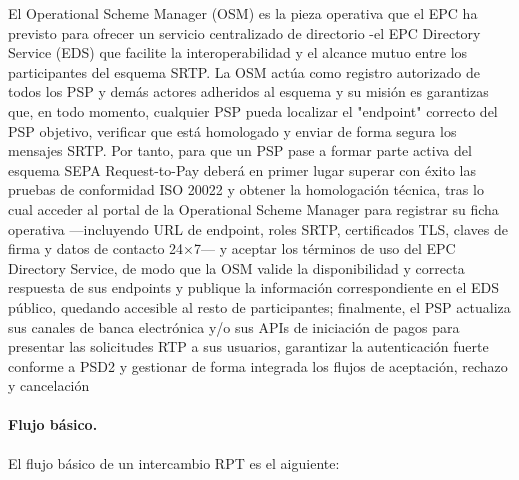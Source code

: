 El Operational Scheme Manager (OSM) es la pieza operativa que el EPC ha previsto para ofrecer un servicio centralizado de directorio -el EPC Directory Service (EDS) que facilite la interoperabilidad y el alcance mutuo entre los participantes del esquema SRTP.
La OSM actúa como registro autorizado de todos los PSP y demás actores adheridos al esquema y su misión es garantizas que, en todo momento, cualquier PSP pueda localizar el "endpoint" correcto del PSP objetivo, verificar que está homologado y enviar de forma segura los mensajes SRTP.
Por tanto, para que un PSP pase a formar parte activa del esquema SEPA Request-to-Pay deberá en primer lugar superar con éxito las pruebas de conformidad ISO 20022 y obtener la homologación técnica, tras lo cual acceder al portal de la Operational Scheme Manager para registrar su ficha operativa —incluyendo URL de endpoint, roles SRTP, certificados TLS, claves de firma y datos de contacto 24×7— y aceptar los términos de uso del EPC Directory Service, de modo que la OSM valide la disponibilidad y correcta respuesta de sus endpoints y publique la información correspondiente en el EDS público, quedando accesible al resto de participantes; finalmente, el PSP actualiza sus canales de banca electrónica y/o sus APIs de iniciación de pagos para presentar las solicitudes RTP a sus usuarios, garantizar la autenticación fuerte conforme a PSD2 y gestionar de forma integrada los flujos de aceptación, rechazo y cancelación\paragraph{Flujo básico.}  
El flujo básico de un intercambio RPT es el aiguiente:
\newpage

